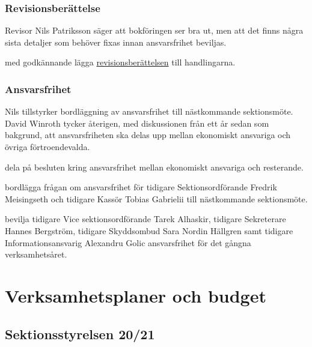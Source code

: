 \documentclass[hidelinks]{../sektionsmote} %
\begin{document}
\subsubsection{Revisionsberättelse}
Revisor Nils Patriksson säger att bokföringen ser bra ut, men att det finns några sista detaljer som behöver fixas innan ansvarsfrihet beviljas.
\begin{beslut}
    \item med godkännande lägga \hyperlink{bilagor/styret/rb.pdf.1}{revisionsberättelsen} till handlingarna.
\end{beslut}

\subsubsection{Ansvarsfrihet}
Nils tillstyrker bordläggning av ansvarsfrihet till nästkommande sektionsmöte.
David Winroth tycker återigen, med diskussionen från ett år sedan som bakgrund, att ansvarsfriheten ska delas upp mellan ekonomiskt ansvariga och övriga förtroendevalda.
\begin{beslut}
    \item dela på besluten kring ansvarsfrihet mellan ekonomiskt ansvariga och resterande.
\end{beslut}
\begin{beslut}
    \item bordlägga frågan om ansvarsfrihet för tidigare Sektionsordförande Fredrik Meisingseth och tidigare Kassör Tobias Gabrielii till nästkommande sektionsmöte.
\end{beslut}
\begin{beslut}
    \item bevilja tidigare Vice sektionsordförande Tarek Alhaskir, tidigare Sekreterare Hannes Bergström, tidigare Skyddsombud Sara Nordin Hällgren samt tidigare Informationsansvarig Alexandru Golic ansvarsfrihet för det gångna verksamhetsåret.
\end{beslut}

\section{Verksamhetsplaner och budget}

\subsection{Sektionsstyrelsen 20/21}
\end{document}
